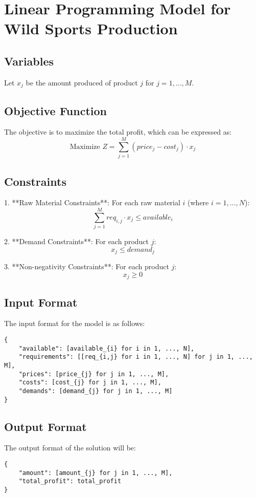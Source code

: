 \documentclass{article}
\begin{document}
\section*{Linear Programming Model for Wild Sports Production}

\subsection*{Variables}
Let \( x_j \) be the amount produced of product \( j \) for \( j = 1, \ldots, M \).

\subsection*{Objective Function}
The objective is to maximize the total profit, which can be expressed as:
\[
\text{Maximize } Z = \sum_{j=1}^{M} (price_j - cost_j) \cdot x_j
\]

\subsection*{Constraints}
1. **Raw Material Constraints**:
   For each raw material \( i \) (where \( i = 1, \ldots, N \)):
   \[
   \sum_{j=1}^{M} req_{i,j} \cdot x_j \leq available_i
   \]

2. **Demand Constraints**:
   For each product \( j \):
   \[
   x_j \leq demand_j
   \]

3. **Non-negativity Constraints**:
   For each product \( j \):
   \[
   x_j \geq 0
   \]

\subsection*{Input Format}
The input format for the model is as follows:
\begin{verbatim}
{
    "available": [available_{i} for i in 1, ..., N],
    "requirements": [[req_{i,j} for i in 1, ..., N] for j in 1, ..., M],
    "prices": [price_{j} for j in 1, ..., M],
    "costs": [cost_{j} for j in 1, ..., M],
    "demands": [demand_{j} for j in 1, ..., M]
}
\end{verbatim}

\subsection*{Output Format}
The output format of the solution will be:
\begin{verbatim}
{
    "amount": [amount_{j} for j in 1, ..., M],
    "total_profit": total_profit
}
\end{verbatim}
\end{document}
